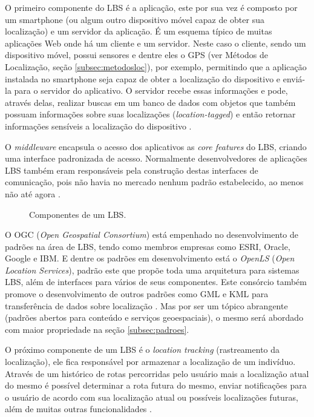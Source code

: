 \documentclass[diss]{template/setrem}
\begin{document}
O primeiro componente do LBS é a aplicação, este por sua vez é composto por um smartphone (ou algum outro dispositivo móvel capaz de obter sua localização) e um servidor da aplicação. É um esquema típico de muitas aplicações Web onde há um cliente e um servidor. Neste caso o cliente, sendo um dispositivo móvel, possui sensores e dentre eles o GPS (ver Métodos de Localização, seção \ref{subsec:metodosloc}), por exemplo, permitindo que a aplicação instalada no smartphone seja capaz de obter a localização do dispositivo e enviá-la para o servidor do aplicativo. O servidor recebe essas informações e pode, através delas, realizar buscas em um banco de dados com objetos que também possuam informações sobre suas localizações (\emph{location-tagged}) e então retornar informações sensíveis a localização do dispositivo \citep{Shek2010}.

O \emph{middleware} encapsula o acesso dos aplicativos as \emph{core features} do LBS, criando uma interface padronizada de acesso. Normalmente desenvolvedores de aplicações LBS também eram responsáveis pela construção destas interfaces de comunicação, pois não havia no mercado nenhum padrão estabelecido, ao menos não até agora \citep{Shek2010}.

\begin{figure}[!h]
    \caption{Componentes de um LBS.}
    \label{fig:lbs-arch}
\end{figure}

O OGC (\emph{Open Geospatial Consortium}) está empenhado no desenvolvimento de padrões na área de LBS, tendo como membros empresas como ESRI, Oracle, Google e IBM. E dentre os padrões em desenvolvimento está o \emph{OpenLS} (\emph{Open Location Services}), padrão este que propõe toda uma arquitetura para sistemas LBS, além de interfaces para vários de seus componentes. Este consórcio também promove o desenvolvimento de outros padrões como GML e KML para transferência de dados sobre localização \citep{Shek2010}. Mas por ser um tópico abrangente (padrões abertos para conteúdo e serviços geoespaciais), o mesmo será abordado com maior propriedade na seção \ref{subsec:padroes}.

O próximo componente de um LBS é o \emph{location tracking} (rastreamento da localização), ele fica responsável por armazenar a localização de um indivíduo. Através de um histórico de rotas percorridas pelo usuário mais a localização atual do mesmo é possível determinar a rota futura do mesmo, enviar notificações para o usuário de acordo com sua localização atual ou possíveis localizações futuras, além de muitas outras funcionalidades \citep{Shek2010}.
\end{document}
